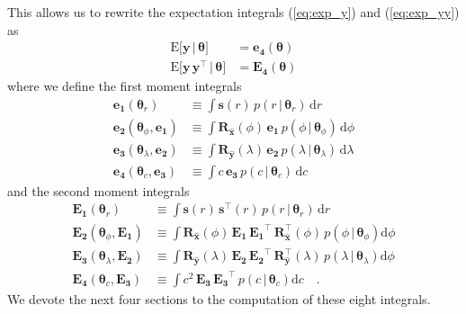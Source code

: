 \documentclass[modern]{aastex62}
\begin{document}
%
This allows us to rewrite the expectation integrals (\ref{eq:exp_y})
and (\ref{eq:exp_yy}) as
%
\begin{align}
    \label{eq:exp_y_sep}
    \mathrm{E} \Big[ \mathbf{y} \, \Big| \, \pmb{\theta} \Big]
     & =
    \mathbf{e_4}(\pmb{\theta})
    \\[1em]
    \label{eq:exp_yy_sep}
    \mathrm{E} \Big[ \mathbf{y} \, \mathbf{y}^\top \, \Big| \, \pmb{\theta} \Big]
     & =
    \mathbf{E_4}(\pmb{\theta})
\end{align}
%
where we define the first moment integrals
%
\begin{align}
    \label{eq:e1}
    \mathbf{e_1}(\pmb{\theta}_r)
     & \equiv
    \int
    \mathbf{s}(r) \,
    p(r \, \big| \, \pmb{\theta}_{r}) \,
    \mathrm{d}r
    \\[1em]
    \label{eq:e2}
    \mathbf{e_2}(\pmb{\theta}_\phi, \mathbf{e_1})
     & \equiv
    \int
    \mathbf{R}_{\hat{\mathbf{x}}}(\phi) \,
    \mathbf{e_1} \,
    p(\phi \, \big| \, \pmb{\theta}_{\phi}) \,
    \mathrm{d}\phi
    \\[1em]
    \label{eq:e3}
    \mathbf{e_3}(\pmb{\theta}_\lambda, \mathbf{e_2})
     & \equiv
    \int
    \mathbf{R}_{\hat{\mathbf{y}}}(\lambda) \,
    \mathbf{e_2} \,
    p(\lambda \, \big| \, \pmb{\theta}_{\lambda}) \,
    \mathrm{d}\lambda
    \\[1em]
    \label{eq:e4}
    \mathbf{e_4}(\pmb{\theta}_c, \mathbf{e_3})
     & \equiv
    \int
    c \,
    \mathbf{e_3} \,
    p(c \, \big| \, \pmb{\theta}_{c}) \,
    \mathrm{d}c
\end{align}
%
and the second moment integrals
%
\begin{align}
    \label{eq:E1}
    \mathbf{E_1}(\pmb{\theta}_r)
     & \equiv
    \int
    \mathbf{s}(r) \, \mathbf{s}^\top(r) \,
    p(r \, \big| \, \pmb{\theta}_{r}) \,
    \mathrm{d}r
    \\[1em]
    \label{eq:E2}
    \mathbf{E_2}(\pmb{\theta}_\phi, \mathbf{E_1})
     & \equiv
    \int
    \mathbf{R}_{\hat{\mathbf{x}}}(\phi) \,
    \mathbf{E_1} \,
    \mathbf{E_1}^\top \,
    \mathbf{R}_{\hat{\mathbf{x}}}^\top(\phi) \,
    p(\phi \, \big| \, \pmb{\theta}_{\phi})
    \mathrm{d}\phi
    \\[1em]
    \label{eq:E3}
    \mathbf{E_3}(\pmb{\theta}_\lambda, \mathbf{E_2})
     & \equiv
    \int
    \mathbf{R}_{\hat{\mathbf{y}}}(\lambda) \,
    \mathbf{E_2} \,
    \mathbf{E_2}^\top \,
    \mathbf{R}_{\hat{\mathbf{y}}}^\top(\lambda) \,
    p(\lambda \, \big| \, \pmb{\theta}_{\lambda})
    \mathrm{d}\phi
    \\[1em]
    \label{eq:E4}
    \mathbf{E_4}(\pmb{\theta}_c, \mathbf{E_3})
     & \equiv
    \int
    c^2 \,
    \mathbf{E_3} \,
    \mathbf{E_3}^\top \,
    p(c \, \big| \, \pmb{\theta}_c)
    \mathrm{d}c
    \quad.
\end{align}
%
We devote the next four sections to the computation of these eight
integrals.





\end{document}
